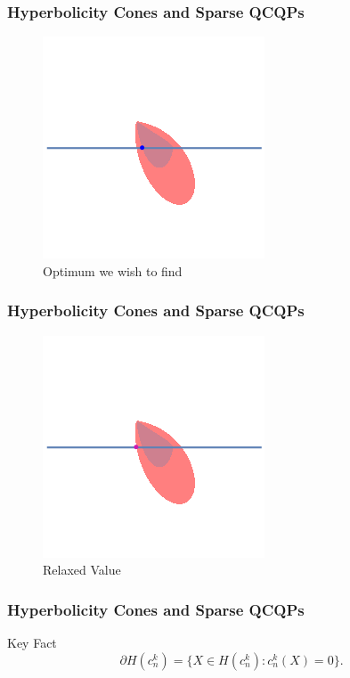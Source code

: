 \documentclass{beamer}
\begin{document}
\begin{frame}
    \frametitle{Hyperbolicity Cones and Sparse QCQPs}
    \begin{figure}[htpb]
        \centering
        \includegraphics[width=0.6\linewidth]{optimum.png}
        \caption{Optimum we wish to find}%
        \label{fig:comparison_line}
    \end{figure}
\end{frame}
\begin{frame}
    \frametitle{Hyperbolicity Cones and Sparse QCQPs}
    \begin{figure}[htpb]
        \centering
        \includegraphics[width=0.6\linewidth]{relaxed.png}
        \caption{Relaxed Value}%
        \label{fig:comparison_line}
    \end{figure}
\end{frame}
\begin{frame}
    \frametitle{Hyperbolicity Cones and Sparse QCQPs}
    \begin{block}{Key Fact}
        \[\partial H(c_n^k) = \{X \in H(c_n^k) : c_n^k(X) = 0\}.\]
    \end{block}
\end{frame}
\end{document}
